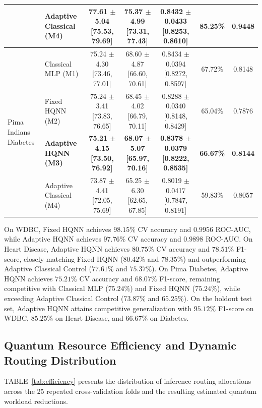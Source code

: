 \documentclass[conference]{IEEEtran}
\begin{document}
\begin{table}[htbp]
\begin{tabular}{llccccc}
& Adaptive Classical (M4) & 77.61 $\pm$ 5.04 [75.53, 79.69] & 75.37 $\pm$ 4.99 [73.31, 77.43] & 0.8432 $\pm$ 0.0433 [0.8253, 0.8610] & 85.25\% & 0.9448 \\
\midrule
\multirow{4}{*}{Pima Indians Diabetes} 
& Classical MLP (M1) & 75.24 $\pm$ 4.30 [73.46, 77.01] & 68.60 $\pm$ 4.87 [66.60, 70.61] & 0.8434 $\pm$ 0.0394 [0.8272, 0.8597] & 67.72\% & 0.8148 \\
& Fixed HQNN (M2) & 75.24 $\pm$ 3.41 [73.83, 76.65] & 68.45 $\pm$ 4.02 [66.79, 70.11] & 0.8288 $\pm$ 0.0340 [0.8148, 0.8429] & 65.04\% & 0.7876 \\
& \textbf{Adaptive HQNN (M3)} & \textbf{75.21 $\pm$ 4.15 [73.50, 76.92]} & \textbf{68.07 $\pm$ 5.07 [65.97, 70.16]} & \textbf{0.8378 $\pm$ 0.0379 [0.8222, 0.8535]} & \textbf{66.67\%} & \textbf{0.8144} \\
& Adaptive Classical (M4) & 73.87 $\pm$ 4.41 [72.05, 75.69] & 65.25 $\pm$ 6.30 [62.65, 67.85] & 0.8019 $\pm$ 0.0417 [0.7847, 0.8191] & 59.83\% & 0.8057 \\
\bottomrule
\end{tabular}
\end{table}

On WDBC, Fixed HQNN achieves $98.15\%$ CV accuracy and $0.9956$ ROC-AUC, while Adaptive HQNN achieves $97.76\%$ CV accuracy and $0.9898$ ROC-AUC. On Heart Disease, Adaptive HQNN achieves $80.75\%$ CV accuracy and $78.51\%$ F1-score, closely matching Fixed HQNN ($80.42\%$ and $78.35\%$) and outperforming Adaptive Classical Control ($77.61\%$ and $75.37\%$). On Pima Diabetes, Adaptive HQNN achieves $75.21\%$ CV accuracy and $68.07\%$ F1-score, remaining competitive with Classical MLP ($75.24\%$) and Fixed HQNN ($75.24\%$), while exceeding Adaptive Classical Control ($73.87\%$ and $65.25\%$). On the holdout test set, Adaptive HQNN attains competitive generalization with $95.12\%$ F1-score on WDBC, $85.25\%$ on Heart Disease, and $66.67\%$ on Diabetes.

\subsection{Quantum Resource Efficiency and Dynamic Routing Distribution}
TABLE~\ref{tab:efficiency} presents the distribution of inference routing allocations across the 25 repeated cross-validation folds and the resulting estimated quantum workload reductions.
\end{document}
